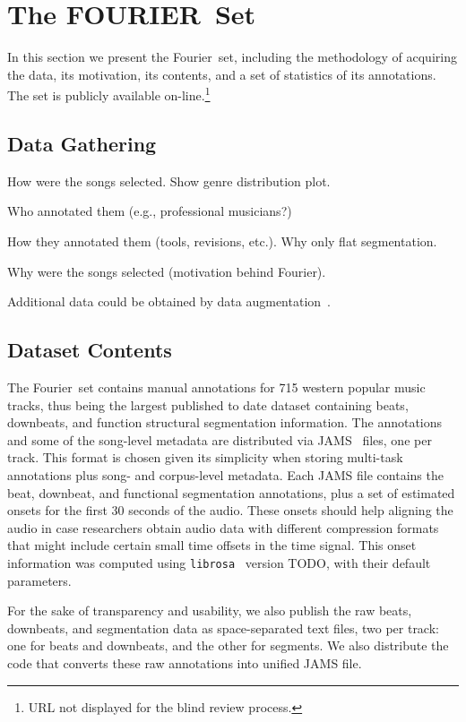 \documentclass{article}
\newcommand{\setNameUpper}{FOURIER}
\newcommand{\setName}{Fourier}
\begin{document}
\section{The \setNameUpper~Set}\label{sec:dataset}

In this section we present the \setName~set, including the methodology of acquiring the data, its motivation, its contents, and a set of statistics of its annotations.
The set is publicly available on-line.\footnote{URL not displayed for the blind review process.}

\subsection{Data Gathering}

How were the songs selected. Show genre distribution plot.

Who annotated them (e.g., professional musicians?)

How they annotated them (tools, revisions, etc.). Why only flat segmentation.

Why were the songs selected (motivation behind \setName).

Additional data could be obtained by data augmentation~\cite{Mcfee2015}.

\subsection{Dataset Contents}

The \setName~set contains manual annotations for 715 western popular music tracks, thus being the largest published to date dataset containing beats, downbeats, and function structural segmentation information.
The annotations and some of the song-level metadata are distributed via JAMS~\cite{Humphrey2014} files, one per track.
This format is chosen given its simplicity when storing multi-task annotations plus song- and corpus-level metadata.
Each JAMS file contains the beat, downbeat, and functional segmentation annotations, plus a set of estimated onsets for the first 30 seconds of the audio.
These onsets should help aligning the audio in case researchers obtain audio data with different compression formats that might include certain small time offsets in the time signal.
This onset information was computed using \texttt{librosa}~\cite{Mcfee2015a} version TODO, with their default parameters.

For the sake of transparency and usability, we also publish the raw beats, downbeats, and segmentation data as space-separated text files, two per track: one for beats and downbeats, and the other for segments.
We also distribute the code that converts these raw annotations into unified JAMS file.
\end{document}
